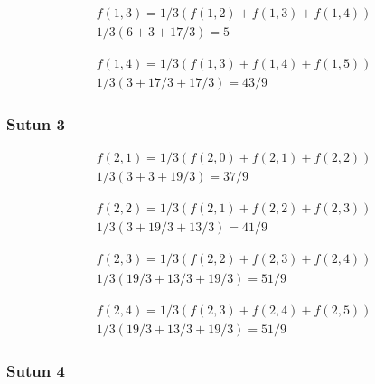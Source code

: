 \documentclass[12pt]{article}
\begin{document}
\begin{equation}
\begin{split}
f(1,3) = 1/3 (f(1,2)+f(1,3)+f(1,4)) \\
1/3 (6+3+17/3) = 5
\end{split}
\end{equation}

\begin{equation}
\begin{split}
f(1,4) = 1/3 (f(1,3)+f(1,4)+f(1,5)) \\
1/3 (3+17/3+17/3) = 43/9
\end{split}
\end{equation}

\subsubsection{Sutun 3}

\begin{equation}
\begin{split}
f(2,1) = 1/3 (f(2,0)+f(2,1)+f(2,2)) \\
1/3 (3+3+19/3) = 37/9
\end{split}
\end{equation}

\begin{equation}
\begin{split}
f(2,2) = 1/3 (f(2,1)+f(2,2)+f(2,3)) \\
1/3 (3+19/3+13/3) = 41/9
\end{split}
\end{equation}

\begin{equation}
\begin{split}
f(2,3) = 1/3 (f(2,2)+f(2,3)+f(2,4)) \\
1/3 (19/3+13/3+19/3) = 51/9
\end{split}
\end{equation}

\begin{equation}
\begin{split}
f(2,4) = 1/3 (f(2,3)+f(2,4)+f(2,5)) \\
1/3 (19/3+13/3+19/3) = 51/9
\end{split}
\end{equation}

\subsubsection{Sutun 4}
\end{document}
